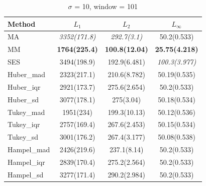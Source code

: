 \documentclass[letterpaper,12pt]{article}
\begin{document}
{%
\begin{table}[H]
\small
\centering
\caption{$\sigma$ = 10, window = 101}
\vspace{-2mm}
\label{tab:s10w101}
\begin{tabular}{lccc}
\toprule
Method      & $L_1$             & $L_2$             & $L_\infty$       \\
\midrule
MA           & \textit{3352(171.8)}  & \textit{292.7(3.1)} & 50.2(0.533)     \\
MM           & \textbf{1764(225.4)}  & \textbf{100.8(12.04)} & \textbf{25.75(4.218)} \\
SES          & 3494(198.9)       & 192.9(6.481)      & \textit{100.3(3.977)} \\
Huber\_mad   & 2323(217.1)       & 210.6(8.782)      & 50.19(0.535)     \\
Huber\_iqr   & 2921(173.7)       & 275.6(2.654)      & 50.2(0.533)      \\
Huber\_sd    & 3077(178.1)       & 275(3.04)         & 50.18(0.534)     \\
Tukey\_mad   & 1951(234)         & 199.3(10.13)      & 50.12(0.536)     \\
Tukey\_iqr   & 2757(169.4)       & 267.6(2.453)      & 50.15(0.534)     \\
Tukey\_sd    & 3001(176.2)       & 267.4(3.177)      & 50.08(0.538)     \\
Hampel\_mad  & 2426(219.6)       & 237.1(8.14)       & 50.2(0.533)      \\
Hampel\_iqr  & 2839(170.4)       & 275.2(2.564)      & 50.2(0.533)      \\
Hampel\_sd   & 3277(171.4)       & 290.2(2.984)      & 50.2(0.533)      \\
\bottomrule
\end{tabular}
\end{table}
\vspace{-6mm}

}
\end{document}

